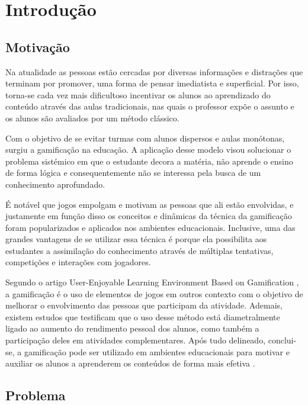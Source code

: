 \chapter{Introdução}
\label{ch:introduction}

\section{Motivação}
\label{sc:motivacao}

Na atualidade as pessoas estão cercadas por diversas informações e distrações que terminam por promover, uma forma de pensar imediatista e superficial. Por isso, torna-se cada vez mais dificultoso incentivar os alunos ao aprendizado do conteúdo através das aulas tradicionais, nas quais o professor expõe o assunto e os alunos são avaliados por um método clássico. \citep{desafioeducadores}

Com o objetivo de se evitar turmas com alunos dispersos e aulas monótonas, surgiu a gamificação na educação. A aplicação desse modelo visou solucionar o problema sistémico em que o estudante decora a matéria, não aprende o ensino de forma lógica e consequentemente não se interessa pela busca de um conhecimento aprofundado. \citep{gamificacaoaplicada}

É notável que jogos empolgam e motivam as pessoas que ali estão envolvidas, e justamente em função disso os conceitos e dinâmicas da técnica da gamificação foram popularizados e aplicados nos ambientes educacionais. Inclusive, uma das grandes vantagens de se utilizar essa técnica é porque ela possibilita aos estudantes a assimilação do conhecimento através de múltiplas tentativas, competições e interações com jogadores.\citep{gamificacaoaplicada}

Segundo o artigo User-Enjoyable Learning Environment Based on Gamification \citep{ieee2015}, a gamificação é o uso de elementos de jogos em outros contexto com o objetivo de melhorar o envolvimento das pessoas que participam da atividade. Ademais, existem estudos que testificam que o uso desse método está diametralmente ligado ao aumento do rendimento pessoal dos alunos, como também a participação deles em atividades complementares. Após tudo delineado, conclui-se, a gamificação pode ser utilizado em ambientes educacionais para motivar e auxiliar os alunos a aprenderem os conteúdos de forma mais efetiva \citep{extensiblegamification}.

\section{Problema}
\label{sc:problema}

